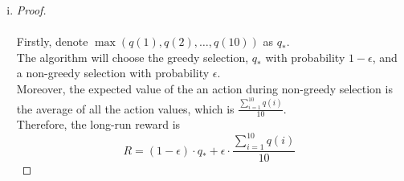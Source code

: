 \documentclass{article}
\begin{document}
\begin{enumerate}[a)]
\begin{enumerate}[i)]
        \item 
        \begin{proof}
            \renewcommand{\qedsymbol}{$\blacksquare$}
            \hfill\\\\
            Firstly, denote $\max(q(1), q(2), \dots, q(10))$ as $q_{*}$.\\
            The algorithm will choose the greedy selection, $q_{*}$ with probability $1 - \epsilon$, and a non-greedy selection with probability $\epsilon$.\\
            Moreover, the expected value of the an action during non-greedy selection is the average of all the action values, which is $\frac{\sum_{i = 1}^{10} q(i)}{10}$.\\
            Therefore, the long-run reward is 
            \begin{equation*}
                R = (1 - \epsilon) \cdot q_{*} + \epsilon \cdot \frac{\sum_{i = 1}^{10} q(i)}{10}
            \end{equation*}\par 
        \end{proof}
        

\end{enumerate}
\end{enumerate}
\end{document}
